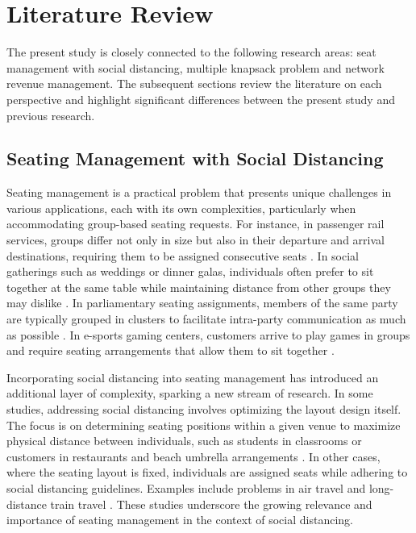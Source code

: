 \section{Literature Review}\label{literature}
The present study is closely connected to the following research areas: seat management with social distancing, multiple knapsack problem and network revenue management. The subsequent sections review the literature on each perspective and highlight significant differences between the present study and previous research.


\subsection{Seating Management with Social Distancing}
Seating management is a practical problem that presents unique challenges in various applications, each with its own complexities, particularly when accommodating group-based seating requests. For instance, in passenger rail services, groups differ not only in size but also in their departure and arrival destinations, requiring them to be assigned consecutive seats \parencite{clausen2010off, deplano2019offline}. In social gatherings such as weddings or dinner galas, individuals often prefer to sit together at the same table while maintaining distance from other groups they may dislike \parencite{lewis2016creating}. In parliamentary seating assignments, members of the same party are typically grouped in clusters to facilitate intra-party communication as much as possible \parencite{vangerven2022parliament}. In e-sports gaming centers, customers arrive to play games in groups and require seating arrangements that allow them to sit together \parencite{kwag2022optimal}.

Incorporating social distancing into seating management has introduced an additional layer of complexity, sparking a new stream of research. In some studies, addressing social distancing involves optimizing the layout design itself. The focus is on determining seating positions within a given venue to maximize physical distance between individuals, such as students in classrooms \parencite{bortolete2022support} or customers in restaurants and beach umbrella arrangements \parencite{fischetti2023safe}. In other cases, where the seating layout is fixed, individuals are assigned seats while adhering to social distancing guidelines. Examples include problems in air travel \parencite{ghorbani2020model} and long-distance train travel \parencite{haque2022optimization}. These studies underscore the growing relevance and importance of seating management in the context of social distancing.


